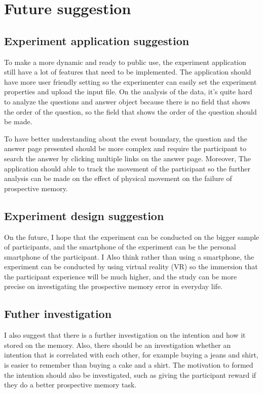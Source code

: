 \section{Future suggestion}

\subsection{Experiment application suggestion}

To make a more dynamic and ready to public use, the experiment application still have a lot of features that need to be implemented.
The application should have more user friendly setting so the experimenter can easily set the experiment properties and upload the input file.
On the analysis of the data, it's quite hard to analyze the questions and answer object because there is no field that shows the order of the question, so
 the field that shows the order of the question should be made.

To have better understanding about the event boundary, the question and the answer page presented should be more complex and require
the participant to search the answer by clicking multiple links on the answer page.
Moreover, The application should able to track the movement of the participant so the further analysis can be made on the effect of physical movement
on the failure of prospective memory.


\subsection{Experiment design suggestion}
On the future, I hope that the experiment can be conducted on the bigger sample of participants, and the smartphone of the experiment can be the
personal smartphone of the participant.
I Also think rather than using a smartphone, the experiment can be conducted by using virtual reality (VR) so the immersion that the participant experience
will be much higher, and the study can be more precise on investigating the prospective memory error in everyday life.

\subsection{Futher investigation}
I also suggest that there is a further investigation on the intention and how it stored on the memory. Also, there should be an investigation
whether an intention that is correlated with each other, for example buying a jeans and shirt, is easier to remember than
buying a cake and a shirt. The motivation to formed the intention should also be investigated, such as giving the participant reward if they do
a better prospective memory task.


